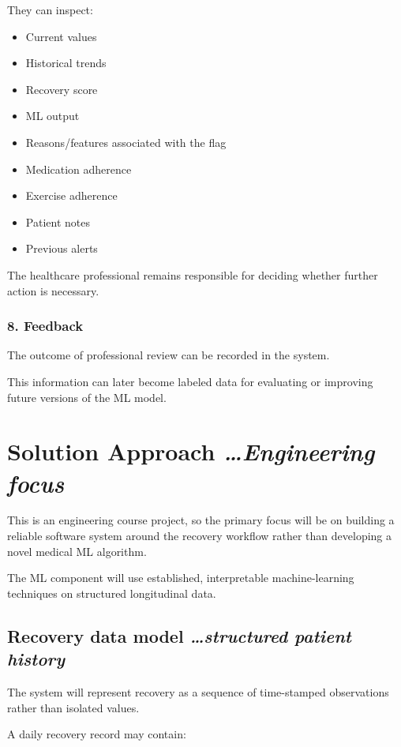 \documentclass[11pt,a4paper]{article}
\newcommand{\BvrHint}[1]{%
  {\normalfont\normalsize\itshape\hfill #1}}
\begin{document}
They can inspect:
\begin{itemize}[leftmargin=0.7cm]
    \item Current values
    \item Historical trends
    \item Recovery score
    \item ML output
    \item Reasons/features associated with the flag
    \item Medication adherence
    \item Exercise adherence
    \item Patient notes
    \item Previous alerts
\end{itemize}

The healthcare professional remains responsible for deciding
whether further action is necessary.

\subsubsection{8. Feedback}

The outcome of professional review can be recorded in the
system.

This information can later become labeled data for evaluating
or improving future versions of the ML model.

\section{Solution Approach %
\BvrHint{\ldots Engineering focus}}

This is an engineering course project, so the primary focus
will be on building a reliable software system around the recovery workflow
rather than developing a novel medical ML algorithm.

The ML component will use established, interpretable
machine-learning techniques on structured longitudinal data.

\subsection{Recovery data model %
\BvrHint{\ldots structured patient history}}

The system will represent recovery as a sequence of
time-stamped observations rather than isolated values.

A daily recovery record may contain:
\end{document}
